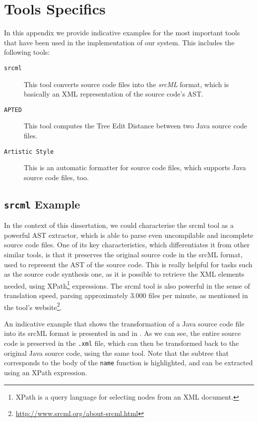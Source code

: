\chapter{Tools Specifics}
\label{chap:tools-specifics}

In this appendix we provide indicative examples for the most important tools that have been used in the implementation of our system. This includes the following tools:

\begin{description}
\item[\texttt{srcml}] This tool converts source code files into the \textit{srcML} format, which is basically an XML representation of the source code's AST.
\item[\texttt{APTED}] This tool computes the Tree Edit Distance between two Java source code files.
\item[\texttt{Artistic Style}] This is an automatic formatter for source code files, which supports Java source code files, too.
\end{description}

\section{\texttt{srcml} Example}
\label{sec:srcml-example}

In the context of this dissertation, we could characterise the srcml tool as a powerful AST extractor, which is able to parse even uncompilable and incomplete source code files. One of its key characteristics, which differentiates it from other similar tools, is that it preserves the original source code in the srcML format, used to represent the AST of the source code. This is really helpful for tasks such as the source code synthesis one, as it is possible to retrieve the XML elements needed, using XPath\footnote{XPath is a query language for selecting nodes from an XML document.} expressions. The srcml tool is also powerful in the sense of translation speed, parsing approximately $3.000$ files per minute, as mentioned in the tool's website\footnote{\url{http://www.srcml.org/about-srcml.html}}.

An indicative example that shows the transformation of a Java source code file into its srcML format is presented in  and in . As we can see, the entire source code is preserved in the \texttt{.xml} file, which can then be transformed back to the original Java source code, using the same tool. Note that the subtree that corresponds to the body of the \texttt{name} function is highlighted, and can be extracted using an XPath expression.

